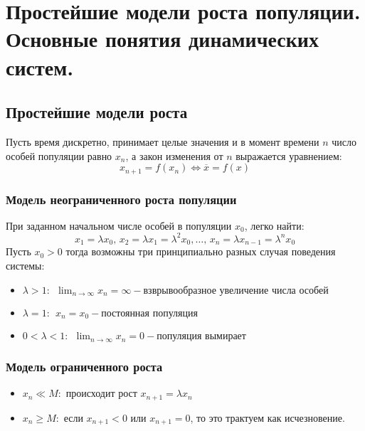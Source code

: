 \chapter{Простейшие модели роста популяции. Основные понятия динамических систем.}
\section{Простейшие модели роста}
Пусть время дискретно, принимает целые значения и в момент времени $n$ число особей популяции равно $x_n$, а закон изменения от $n$ выражается уравнением:
$$x_{n+1} = f(x_n) \Leftrightarrow \overline{x} = f(x)$$

\subsection{Модель неограниченного роста популяции}
При заданном начальном числе особей в популяции $x_0$, легко найти: 
$$ x_1 = \lambda x_0, \, x_2 = \lambda x_1 = \lambda^2 x_0, \dots, \, x_n = \lambda x_{n-1} = \lambda^n x_0$$
Пусть $x_0 > 0$ тогда возможны три принципиально разных случая поведения системы:
\begin{itemize}
    \item $\lambda > 1{:} \ \ \lim_{n \to \infty} x_n = \infty - \text{взврывообразное увеличение числа особей}$
    \item $ \lambda = 1{:} \ \ x_n = x_0 - \text{постоянная популяция}$
    \item $ 0 < \lambda < 1{:} \ \ \lim_{n \to \infty} x_n = 0 - \text{популяция вымирает}$
\end{itemize}

\subsection{Модель ограниченного роста}

\begin{itemize}
    \item $x_{n} \ll M{:} $ происходит рост $x_{n+1} =  \lambda x_{n}$
    \item $x_{n} \geq M{:} $ если $x_{n+1} < 0$ или $x_{n+1} = 0$, то это трактуем как исчезновение.
\end{itemize}

